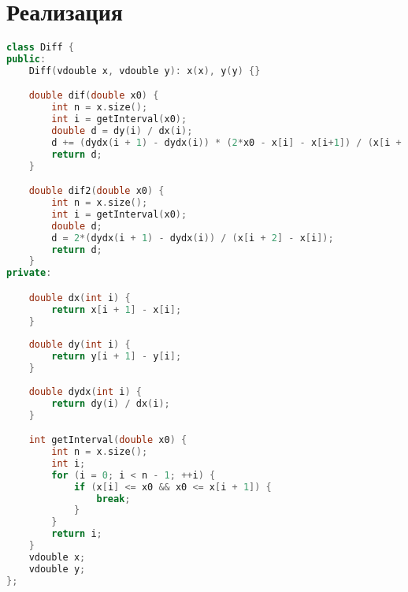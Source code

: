\section*{Реализация}

\begin{lstlisting}[language=C++]
class Diff {
public:
    Diff(vdouble x, vdouble y): x(x), y(y) {}

    double dif(double x0) {
        int n = x.size();
        int i = getInterval(x0);
        double d = dy(i) / dx(i);
        d += (dydx(i + 1) - dydx(i)) * (2*x0 - x[i] - x[i+1]) / (x[i + 2] - x[i]);
        return d;
    }

    double dif2(double x0) {
        int n = x.size();
        int i = getInterval(x0);
        double d;
        d = 2*(dydx(i + 1) - dydx(i)) / (x[i + 2] - x[i]);
        return d;
    }
private:

    double dx(int i) {
        return x[i + 1] - x[i];
    }
    
    double dy(int i) {
        return y[i + 1] - y[i];
    }
        
    double dydx(int i) {
        return dy(i) / dx(i);
    }

    int getInterval(double x0) {
        int n = x.size();
        int i;
        for (i = 0; i < n - 1; ++i) {
            if (x[i] <= x0 && x0 <= x[i + 1]) {
                break;
            }
        }
        return i;
    }
    vdouble x;
    vdouble y;
};
\end{lstlisting}

\pagebreak
